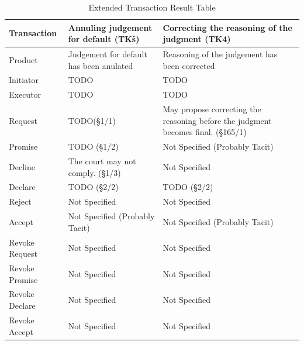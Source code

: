 \begin{landscape}
\begin{table}[h]
\caption{Extended Transaction Result Table}
\label{tab:etrt}
\begin{tabular}{|l||l|l|}
\hline
Transaction  & Annuling judgement for default (TKš) & Correcting the reasoning of the judgment (TK4) \\ \hline
Product      & Judgement for default has been anulated  & Reasoning of the judgement has been corrected \\ \hline
Initiator      &  TODO   &  TODO\\ \hline
Executor       &  TODO &  TODO       \\ \hline
Request        & TODO(\S1/1)  & May propose correcting the reasoning before the judgment becomes final.  (\S165/1)   \\ \hline
Promise        &  TODO  (\S1/2)  &  Not Specified (Probably Tacit)   \\ \hline
Decline        &  The court may not comply. (\S1/3)  & Not Specified  \\ \hline
Declare        & TODO (\S2/2) & TODO (\S2/2) \\ \hline
Reject         &  Not Specified             &  Not Specified   \\ \hline
Accept         & Not Specified (Probably Tacit) &  Not Specified (Probably Tacit) \\ \hline
Revoke Request & Not Specified                   & Not Specified        \\ \hline
Revoke Promise & Not Specified                   &  Not Specified       \\ \hline
Revoke Declare & Not Specified                    &  Not Specified      \\ \hline
Revoke Accept  &  Not Specified             &   Not Specified             \\ \hline
\end{tabular}
\end{table}


\end{landscape}
